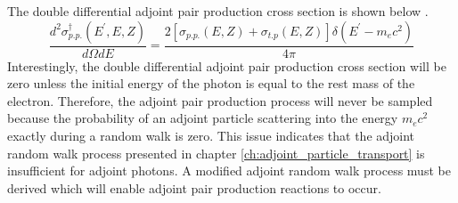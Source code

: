 The double differential adjoint pair production cross section is shown below
\citep{hoogenboom_adjoint_2000}.
\begin{equation}
  \frac{d^2\sigma_{p.p.}^{\dagger}(E^{'},E,Z)}{d\Omega dE} = 
  \frac{2\left[\sigma_{p.p.}(E,Z)+\sigma_{t.p}(E,Z)\right]\delta(E^{'}-m_ec^2)}
  {4\pi}
\end{equation}
Interestingly, the double differential adjoint pair production cross section
will be zero unless the initial energy of the photon is equal to the rest mass 
of the electron. Therefore, the adjoint pair production process will never be
sampled because the probability of an adjoint particle scattering into the
energy $m_ec^2$ exactly during a random walk is zero. This issue indicates that
the adjoint random walk process presented in chapter 
\ref{ch:adjoint_particle_transport} is insufficient for adjoint photons. A 
modified adjoint random walk process must be derived which will enable adjoint 
pair production reactions to occur. 

